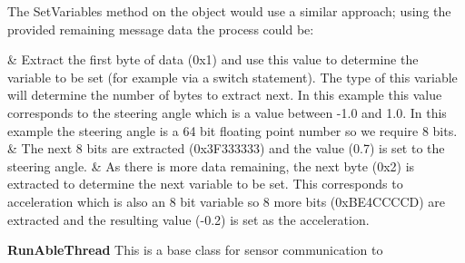 \documentclass{article}
\begin{document}
The SetVariables method on the object would use a similar approach; using the provided remaining message data the process could be:
\begin{easylist}[itemize]
	& Extract the first byte of data (0x1) and use this value to determine the variable to be set (for example via a switch statement). The type of this variable will determine the number of bytes to extract next. In this example this value corresponds to the steering angle which is a value between -1.0 and 1.0. In this example the steering angle is a 64 bit floating point number so we require 8 bits.
	& The next 8 bits are extracted (0x3F333333) and the value (0.7) is set to the steering angle.
	& As there is more data remaining, the next byte (0x2) is extracted to determine the next variable to be set. This corresponds to acceleration which is also an 8 bit variable so 8 more bits (0xBE4CCCCD) are extracted and the resulting value (-0.2) is set as the acceleration.
\end{easylist}




\textbf{RunAbleThread}
This is a base class for sensor communication to 

\end{document}
